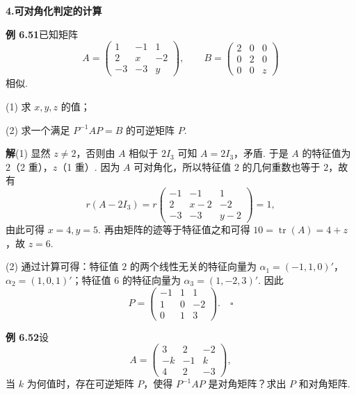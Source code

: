 \documentclass[UTF8, 12pt, fontset=fandol, oneside]{ctexart}
\begin{document}
\noindent\textbf{4.\quad 可对角化判定的计算}

\noindent\textbf{例 6.51}\quad 已知矩阵
\[
A=\left(\begin{array}{ccc}
1 & -1 & 1\\
2 & x & -2\\
-3 & -3 & y
\end{array}\right),\qquad
B=\left(\begin{array}{ccc}
2 & 0 & 0\\
0 & 2 & 0\\
0 & 0 & z
\end{array}\right)
\]
相似.

(1) 求 $x,y,z$ 的值；

(2) 求一个满足 $P^{-1}AP=B$ 的可逆矩阵 $P$.

\noindent\textbf{解}\quad (1) 显然 $z\ne 2$，否则由 $A$ 相似于 $2I_3$ 可知 $A=2I_3$，矛盾. 于是 $A$ 的特征值为 $2$（2 重），$z$（1 重）. 因为 $A$ 可对角化，所以特征值 $2$ 的几何重数也等于 $2$，故有
\[
r(A-2I_3)=r\left(\begin{array}{ccc}
-1 & -1 & 1\\
2 & x-2 & -2\\
-3 & -3 & y-2
\end{array}\right)=1,
\]
由此可得 $x=4,y=5$. 再由矩阵的迹等于特征值之和可得 $10=\operatorname{tr}(A)=4+z$，故 $z=6$.

(2) 通过计算可得：特征值 $2$ 的两个线性无关的特征向量为 $\alpha_1=(-1,1,0)'$，$\alpha_2=(1,0,1)'$；特征值 $6$ 的特征向量为 $\alpha_3=(1,-2,3)'$. 因此
\[
P=\left(\begin{array}{ccc}
-1 & 1 & 1\\
1 & 0 & -2\\
0 & 1 & 3
\end{array}\right). \quad \square
\]

\noindent\textbf{例 6.52}\quad 设
\[
A=\left(\begin{array}{ccc}
3 & 2 & -2\\
-k & -1 & k\\
4 & 2 & -3
\end{array}\right),
\]
当 $k$ 为何值时，存在可逆矩阵 $P$，使得 $P^{-1}AP$ 是对角矩阵？求出 $P$ 和对角矩阵.
\end{document}
